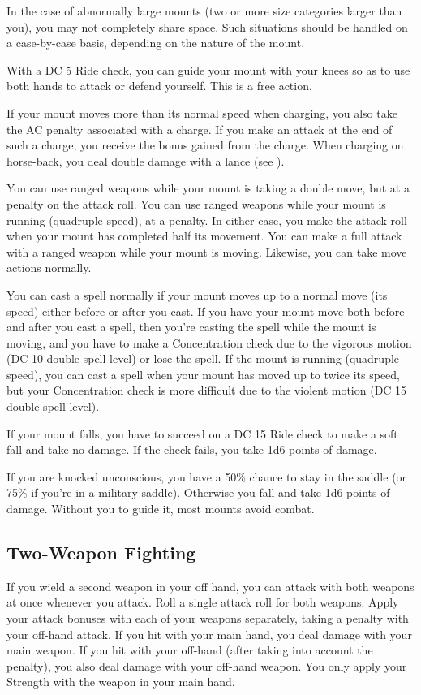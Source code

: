 In the case of abnormally large mounts (two or more size categories larger than you), you may not completely share space. Such situations should be handled on a case-by-case basis, depending on the nature of the mount.

 With a DC 5 Ride check, you can guide your mount with your knees so as to use both hands to attack or defend yourself. This is a free action.

If your mount moves more than its normal speed when charging, you also take the AC penalty associated with a charge. If you make an attack at the end of such a charge, you receive the bonus gained from the charge. When charging on horse-back, you deal double damage with a lance (see ).

You can use ranged weapons while your mount is taking a double move, but at a  penalty on the attack roll. You can use ranged weapons while your mount is running (quadruple speed), at a  penalty. In either case, you make the attack roll when your mount has completed half its movement. You can make a full attack with a ranged weapon while your mount is moving. Likewise, you can take move actions normally.

 You can cast a spell normally if your mount moves up to a normal move (its speed) either before or after you cast. If you have your mount move both before and after you cast a spell, then you're casting the spell while the mount is moving, and you have to make a Concentration check due to the vigorous motion (DC 10 \add double spell level) or lose the spell. If the mount is running (quadruple speed), you can cast a spell when your mount has moved up to twice its speed, but your Concentration check is more difficult due to the violent motion (DC 15 \add double spell level).

 If your mount falls, you have to succeed on a DC 15 Ride check to make a soft fall and take no damage. If the check fails, you take 1d6 points of damage.

 If you are knocked unconscious, you have a 50\% chance to stay in the saddle (or 75\% if you're in a military saddle). Otherwise you fall and take 1d6 points of damage. Without you to guide it, most mounts avoid combat.

\subsection{Two-Weapon Fighting}
If you wield a second weapon in your off hand, you can attack with both weapons at once whenever you attack. Roll a single attack roll for both weapons. Apply your attack bonuses with each of your weapons separately, taking a  penalty with your off-hand attack. If you hit with your main hand, you deal damage with your main weapon. If you hit with your off-hand (after taking into account the  penalty), you also deal damage with your off-hand weapon. You only apply your Strength with the weapon in your main hand. 

